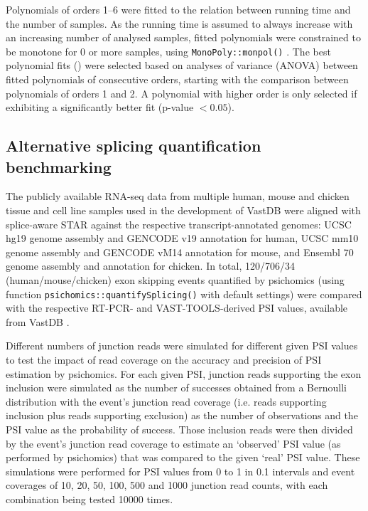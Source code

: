 Polynomials of orders 1–6 were fitted to the relation between running time and the number of samples. As the running time is assumed to always increase with an increasing number of analysed samples, fitted polynomials were constrained to be monotone for 0 or more samples, using \texttt{MonoPoly::monpol()} \cite{murray:2016um}. The best polynomial fits () were selected based on analyses of variance (ANOVA) between fitted polynomials of consecutive orders, starting with the comparison between polynomials of orders 1 and 2. A polynomial with higher order is only selected if exhibiting a significantly better fit (p-value $< 0.05$).

\subsection{Alternative splicing quantification benchmarking}

The publicly available RNA-seq data from multiple human, mouse and chicken tissue and cell line samples used in the development of VastDB \cite{tapial:2017ui} were aligned with splice-aware STAR \cite{dobin:2013ts} against the respective transcript-annotated genomes: UCSC hg19 genome assembly and GENCODE v19 annotation for human, UCSC mm10 genome assembly and GENCODE vM14 annotation for mouse, and Ensembl 70 genome assembly and annotation for chicken. In total, 120/706/34 (human/mouse/chicken) exon skipping events quantified by psichomics (using function \texttt{psichomics::quantifySplicing()} with default settings) were compared with the respective RT-PCR- and VAST-TOOLS-derived PSI values, available from VastDB \cite{tapial:2017ui}.

Different numbers of junction reads were simulated for different given PSI values to test the impact of read coverage on the accuracy and precision of PSI estimation by psichomics. For each given PSI, junction reads supporting the exon inclusion were simulated as the number of successes obtained from a Bernoulli distribution with the event's junction read coverage (i.e. reads supporting inclusion plus reads supporting exclusion) as the number of observations and the PSI value as the probability of success. Those inclusion reads were then divided by the event's junction read coverage to estimate an ‘observed’ PSI value (as performed by psichomics) that was compared to the given ‘real’ PSI value. These simulations were performed for PSI values from 0 to 1 in 0.1 intervals and event coverages of 10, 20, 50, 100, 500 and 1000 junction read counts, with each combination being tested 10000 times.

